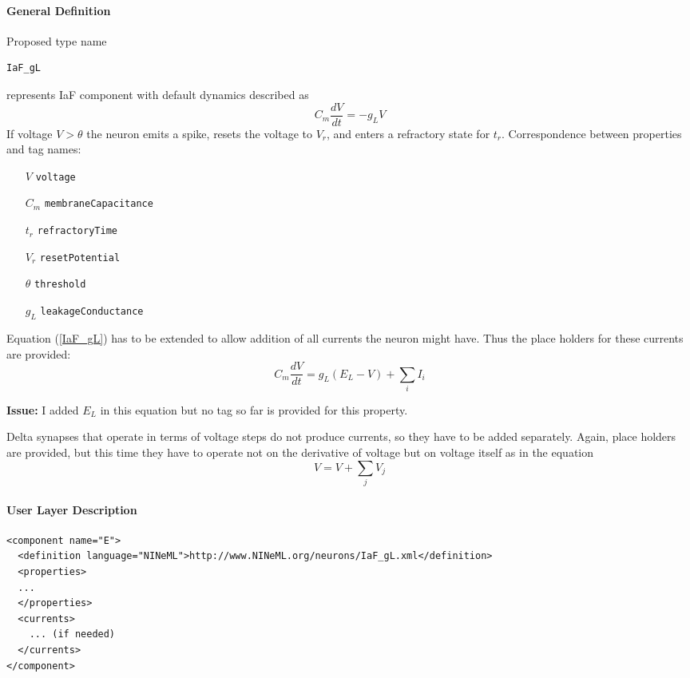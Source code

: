 \documentclass{article}
\newcommand{\issue}[1]{%
\begin{center}
\colorbox{issuecolor}{\parbox{0.8\linewidth}{\textbf{Issue:} #1}}
\end{center}%
}
\begin{document}
\paragraph{General Definition}
Proposed type name {\begin{verbatim}IaF_gL\end{verbatim}} represents IaF
component with default dynamics described as
\begin{equation}
C_m\frac{dV}{dt}=-g_LV
\label{IaF_gL}
\end{equation}
If voltage $V>\theta$ the neuron emits a spike, resets the voltage to
$V_r$, and enters a refractory state for $t_r$. Correspondence between
properties and tag names:
\begin{itemize}
\item[$V$] {\tt voltage}
\item[$C_m$] {\tt membraneCapacitance}
\item[$t_r$] {\tt refractoryTime}
\item[$V_r$] {\tt resetPotential}
\item[$\theta$] {\tt threshold}
\item[$g_L$] {\tt leakageConductance}
\end{itemize}
Equation (\ref{IaF_gL}) has to be extended to allow addition of all
currents the neuron might have. Thus the place holders for these currents
are provided:
\begin{equation}
C_m\frac{dV}{dt}=g_L(E_L-V)+\sum_i{I_i}
\label{IaF_gL_full}
\end{equation}

\issue{I added $E_L$ in this equation but no tag so far is provided for this
property.}

Delta synapses that operate in terms of voltage steps do not produce
currents, so they have to be added separately. Again, place holders
are provided, but this time they have to operate not on the derivative
of voltage but on voltage itself as in the equation
\begin{equation}
V=V+\sum_j{V_j}
\label{IaF_gL_delta}
\end{equation}

\paragraph{User Layer Description}
\begin{verbatim}
<component name="E">
  <definition language="NINeML">http://www.NINeML.org/neurons/IaF_gL.xml</definition>
  <properties>
  ...
  </properties>
  <currents>
    ... (if needed)
  </currents>
</component>
\end{verbatim}
\end{document}
